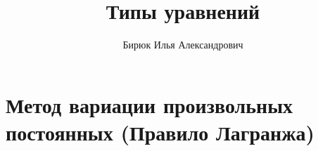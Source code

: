 \documentclass{article}
\title{Типы уравнений}
\author{Бирюк Илья Александрович}
\begin{document}
\maketitle
\newpage
\tableofcontents
\newpage
\section{Метод вариации произвольных постоянных (Правило Лагранжа)}
\end{document}
